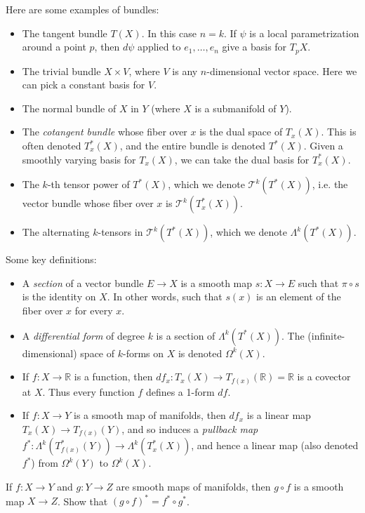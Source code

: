 \documentclass[12pt]{amsbook}
\newcommand{\T}{{\mathcal T}}
\newcommand{\R}{{\mathbb R}}
\theoremstyle{definition}
\begin{document}
Here are some examples of bundles:
\begin{itemize}
\item The tangent bundle $T(X)$. In this case $n=k$. If $\psi$ is a local
parametrization around a point $p$, 
then $d\psi$ applied to $e_1,\ldots,e_n$ give a basis for $T_pX$.
\item The trivial bundle $X \times V$, where $V$ is any $n$-dimensional
vector space. Here we can pick a constant basis for $V$. 
\item The normal bundle of $X$ in $Y$ (where $X$ is a submanifold of $Y$).
\item The {\em cotangent bundle} whose fiber over $x$ is the dual 
space of $T_x(X)$.
This is often denoted $T^*_x(X)$, and the entire bundle is denoted $T^*(X)$.
Given a smoothly varying basis for $T_x(X)$, we can take the dual basis
for $T_x^*(X)$. 
\item The $k$-th tensor power of $T^*(X)$, which we denote $\T^k(T^*(X))$,
i.e. the vector bundle whose fiber
over $x$ is $\T^k(T_x^*(X))$. 
\item The alternating $k$-tensors in $\T^k(T^*(X))$, which we denote
$\Lambda^k(T^*(X))$. 
\end{itemize}

Some key definitions:
\begin{itemize}

\item A {\em section} of a vector bundle $E \to X$ is a smooth map
$s: X \to E$ such that $\pi\circ s$ is the identity on $X$. In other words,
such that $s(x)$ is an element of the fiber over $x$ for every $x$. 

\item A {\em differential form} of degree $k$ is a section of 
$\Lambda^k(T^*(X))$. The (infinite-dimensional) space of $k$-forms on 
$X$ is denoted $\Omega^k(X)$.

\item If $f: X \to \R$ is a function, then $df_x: T_x(X) \to T_{f(x)}(\R)=\R$
is a covector at $X$. Thus every function $f$ defines a 1-form $df$. 

\item If $f: X \to Y$ is a smooth map of manifolds, then $df_x$ is a linear map
$T_x(X)\to T_{f(x)}(Y)$, and so induces a {\em pullback map}
$f^*: \Lambda^k(T_{f(x)}^*(Y)) \to \Lambda^k(T_x^*(X))$, and hence a linear map
(also denoted $f^*$) from $\Omega^k(Y)$ to $\Omega^k(X)$. 
\end{itemize}

 If $f: X \to Y$ and $g: Y \to Z$ are smooth maps
of manifolds, then $g \circ f$ is a smooth map $X \to Z$. Show that 
$(g \circ f)^* = f^* \circ g^*$.  
 
\end{document}
